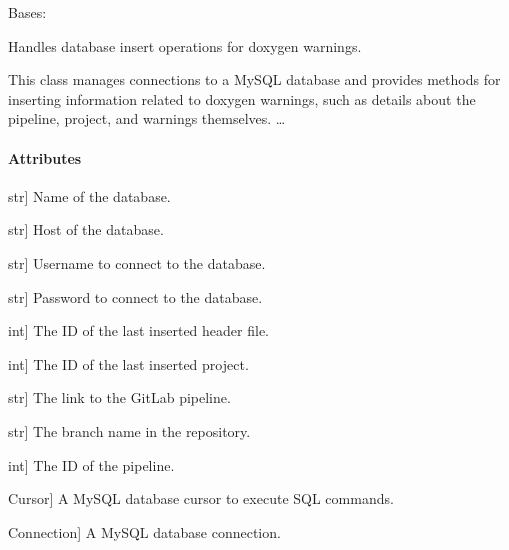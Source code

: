 \documentclass[letterpaper,10pt,english]{sphinxmanual}
\begin{document}
\begin{fulllineitems}
\label{\detokenize{main.db_operations:main.db_operations.db_insertion_handler.DBInsertionHandler}}
\pysigstartsignatures
{}
\pysigstopsignatures
\sphinxAtStartPar
Bases: 

\sphinxAtStartPar
Handles database insert operations for doxygen warnings.

\sphinxAtStartPar
This class manages connections to a MySQL database and provides methods for
inserting information related to doxygen warnings, such as details about the
pipeline, project, and warnings themselves.
…


\paragraph{Attributes}
\label{\detokenize{main.db_operations:attributes}}\begin{description}
\sphinxlineitem{\_\_db\_name}{[}str{]}
\sphinxAtStartPar
Name of the database.

\sphinxlineitem{\_\_db\_host}{[}str{]}
\sphinxAtStartPar
Host of the database.

\sphinxlineitem{\_\_db\_user}{[}str{]}
\sphinxAtStartPar
Username to connect to the database.

\sphinxlineitem{\_\_db\_pass}{[}str{]}
\sphinxAtStartPar
Password to connect to the database.

\sphinxlineitem{last\_header\_file\_id}{[}int{]}
\sphinxAtStartPar
The ID of the last inserted header file.

\sphinxlineitem{last\_project\_id}{[}int{]}
\sphinxAtStartPar
The ID of the last inserted project.

\sphinxlineitem{pipeline\_link}{[}str{]}
\sphinxAtStartPar
The link to the GitLab pipeline.

\sphinxlineitem{branch\_name}{[}str{]}
\sphinxAtStartPar
The branch name in the repository.

\sphinxlineitem{pipeline\_id}{[}int{]}
\sphinxAtStartPar
The ID of the pipeline.

\sphinxlineitem{cursor}{[}Cursor{]}
\sphinxAtStartPar
A MySQL database cursor to execute SQL commands.

\sphinxlineitem{db}{[}Connection{]}
\sphinxAtStartPar
A MySQL database connection.


\end{description}
\end{fulllineitems}
\end{document}
